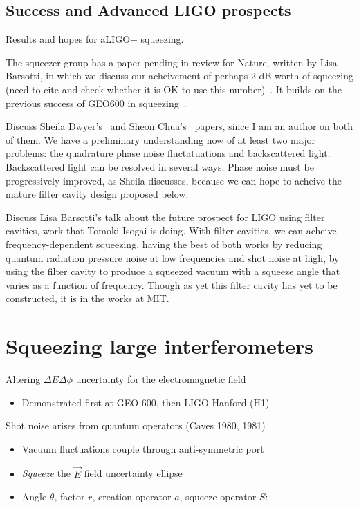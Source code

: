         \subsection{Success and Advanced LIGO prospects}
        \label{squeezing_success}

            Results and hopes for aLIGO+ squeezing.

	    The squeezer group has a paper pending in review for Nature, written by Lisa Barsotti, in which we discuss our acheivement of perhaps 2 dB worth of squeezing (need to cite and check whether it is OK to use this number)~\cite{BarsottiNatureSqueezing}. It builds on the previous success of GEO600 in squeezing~\cite{GEO600NatureSqueezing}.

	    Discuss Sheila Dwyer's~\cite{DwyerPhaseNoise} and Sheon Chua's~\cite{ChuaBackscatteredLight} papers, since I am an author on both of them. We have a preliminary understanding now of at least two major problems: the quadrature phase noise fluctatuations and backscattered light. Backscattered light can be resolved in several ways. Phase noise must be progressively improved, as Sheila discusses, because we can hope to acheive the mature filter cavity design proposed below.

Discuss Lisa Barsotti's talk about the future prospect for LIGO using filter cavities, work that Tomoki Isogai is doing. With filter cavities, we can acheive frequency-dependent squeezing, having the best of both works by reducing quantum radiation pressure noise at low frequencies and shot noise at high, by using the filter cavity to produce a squeezed vacuum with a squeeze angle that varies as a function of frequency. Though as yet this filter cavity has yet to be constructed, it is in the works at MIT.


\section{Squeezing large interferometers}

Altering $\Delta E\Delta\phi$ uncertainty for the electromagnetic
field
\begin{itemize}
\item Demonstrated first at GEO 600, then LIGO Hanford (H1)\end{itemize}
\begin{theorem}
Shot noise arises from quantum operators (Caves 1980, 1981)\end{theorem}
\begin{itemize}
\item Vacuum fluctuations couple through anti-symmetric port
\item \emph{Squeeze }the $\overrightarrow{E}$ field uncertainty ellipse
\item Angle $\theta$, factor $r$, creation operator $a$, squeeze operator
$S$:
\end{itemize}

